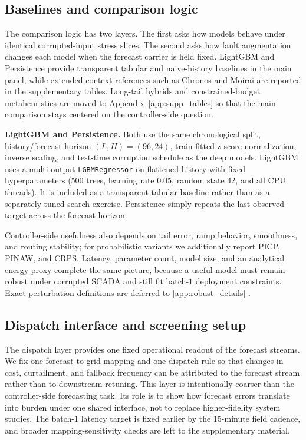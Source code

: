 \documentclass[review,1p,times]{elsarticle}
\begin{document}
\subsection{Baselines and comparison logic}
\label{sec:robust_protocol}

The comparison logic has two layers. The first asks how models behave under identical corrupted-input stress slices. The second asks how fault augmentation changes each model when the forecast carrier is held fixed. LightGBM and Persistence provide transparent tabular and naive-history baselines in the main panel, while extended-context references such as Chronos and Moirai are reported in the supplementary tables. Long-tail hybrids and constrained-budget metaheuristics are moved to Appendix~\ref{app:supp_tables} so that the main comparison stays centered on the controller-side question.

\noindent\textbf{LightGBM and Persistence.} Both use the same chronological split, history/forecast horizon $(L,H)=(96,24)$, train-fitted z-score normalization, inverse scaling, and test-time corruption schedule as the deep models. LightGBM uses a multi-output \texttt{LGBMRegressor} on flattened history with fixed hyperparameters (500 trees, learning rate 0.05, random state 42, and all CPU threads). It is included as a transparent tabular baseline rather than as a separately tuned search exercise. Persistence simply repeats the last observed target across the forecast horizon.

Controller-side usefulness also depends on tail error, ramp behavior, smoothness, and routing stability; for probabilistic variants we additionally report PICP, PINAW, and CRPS. Latency, parameter count, model size, and an analytical energy proxy complete the same picture, because a useful model must remain robust under corrupted SCADA and still fit batch-$1$ deployment constraints. Exact perturbation definitions are deferred to \ref{app:robust_details} \cite{schwartz2020greenai,strubell2019energy}.

\subsection{Dispatch interface and screening setup}
\label{subsec:dispatch_setup}
The dispatch layer provides one fixed operational readout of the forecast streams. We fix one forecast-to-grid mapping and one dispatch rule so that changes in cost, curtailment, and fallback frequency can be attributed to the forecast stream rather than to downstream retuning. This layer is intentionally coarser than the controller-side forecasting task. Its role is to show how forecast errors translate into burden under one shared interface, not to replace higher-fidelity system studies. The batch-$1$ latency target is fixed earlier by the 15-minute field cadence, and broader mapping-sensitivity checks are left to the supplementary material.
\end{document}
